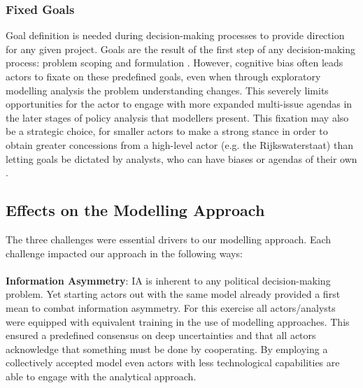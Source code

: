 \subsubsection{Fixed Goals}
Goal definition is needed during decision-making processes to provide direction for any given project. Goals are the result of the first step of any decision-making process: problem scoping and formulation \parencite{enserink_policy_2010}. However, cognitive bias often leads actors to fixate on these predefined goals, even when through exploratory modelling analysis the problem understanding changes. This severely limits opportunities for the actor to engage with more expanded multi-issue agendas in the later stages of policy analysis that modellers present. This fixation may also be a strategic choice, for smaller actors to make a strong stance in order to obtain greater concessions from a high-level actor (e.g. the Rijkswaterstaat) than letting goals be dictated by analysts, who can have biases or agendas of their own \parencite{hans_de_bruijn_mark_de_bruijne_ernst_ten_heuvelhof_politics_2015}. 

\subsection{Effects on the Modelling Approach}

The three challenges were essential drivers to our modelling approach. Each challenge impacted our approach in the following ways: \\
\\
\textbf{Information Asymmetry}: IA is inherent to any political decision-making problem. Yet starting actors out with the same model already provided a first mean to combat information asymmetry. For this exercise all actors/analysts were equipped with equivalent training in the use of modelling approaches. This ensured a predefined consensus on deep uncertainties and that all actors acknowledge that something must be done by cooperating. By employing a collectively accepted model even actors with less technological capabilities are able to engage with the analytical approach.

